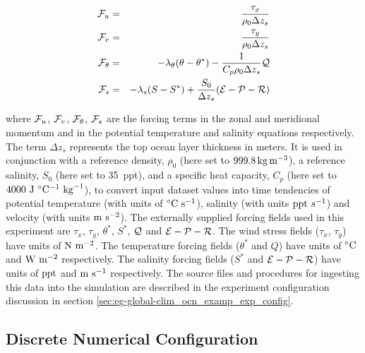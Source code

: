 \begin{eqnarray}
\label{eq:eg-global-global_forcing}
\label{eq:eg-global-global_forcing_fu}
{\cal F}_{u} & = & \frac{\tau_{x}}{\rho_{0} \Delta z_{s}}
\\
\label{eq:eg-global-global_forcing_fv}
{\cal F}_{v} & = & \frac{\tau_{y}}{\rho_{0} \Delta z_{s}}
\\
\label{eq:eg-global-global_forcing_ft}
{\cal F}_{\theta} & = & - \lambda_{\theta} ( \theta - \theta^{\ast} ) 
 - \frac{1}{C_{p} \rho_{0} \Delta z_{s}}{\cal Q}
\\
\label{eq:eg-global-global_forcing_fs}
{\cal F}_{s} & = & - \lambda_{s} ( S - S^{\ast} ) 
 + \frac{S_{0}}{\Delta z_{s}}({\cal E} - {\cal P} - {\cal R})
\end{eqnarray}

\noindent where ${\cal F}_{u}$, ${\cal F}_{v}$, ${\cal F}_{\theta}$,
${\cal F}_{s}$ are the forcing terms in the zonal and meridional
momentum and in the potential temperature and salinity
equations respectively.
The term $\Delta z_{s}$ represents the top ocean layer thickness in
meters.
It is used in conjunction with a reference density, $\rho_{0}$
(here set to $999.8\,{\rm kg\,m^{-3}}$), a
reference salinity, $S_{0}$ (here set to 35~ppt),
and a specific heat capacity, $C_{p}$ (here set to
$4000~{\rm J}~^{\circ}{\rm C}^{-1}~{\rm kg}^{-1}$), to convert
input dataset values into time tendencies of
potential temperature (with units of $^{\circ}{\rm C}~{\rm s}^{-1}$),
salinity (with units ${\rm ppt}~s^{-1}$) and
velocity (with units ${\rm m}~{\rm s}^{-2}$).
The externally supplied forcing fields used in this
experiment are $\tau_{x}$, $\tau_{y}$, $\theta^{\ast}$, $S^{\ast}$,
$\cal{Q}$ and $\cal{E}-\cal{P}-\cal{R}$. The wind stress fields ($\tau_x$, $\tau_y$)
have units of ${\rm N}~{\rm m}^{-2}$. The temperature forcing fields
($\theta^{\ast}$ and $Q$) have units of $^{\circ}{\rm C}$ and ${\rm W}~{\rm m}^{-2}$
respectively. The salinity forcing fields ($S^{\ast}$ and 
$\cal{E}-\cal{P}-\cal{R}$) have units of ${\rm ppt}$ and ${\rm m}~{\rm s}^{-1}$
respectively. The source files and procedures for ingesting this data into the
simulation are described in the experiment configuration discussion in section
\ref{sec:eg-global-clim_ocn_examp_exp_config}.


\subsection{Discrete Numerical Configuration}


